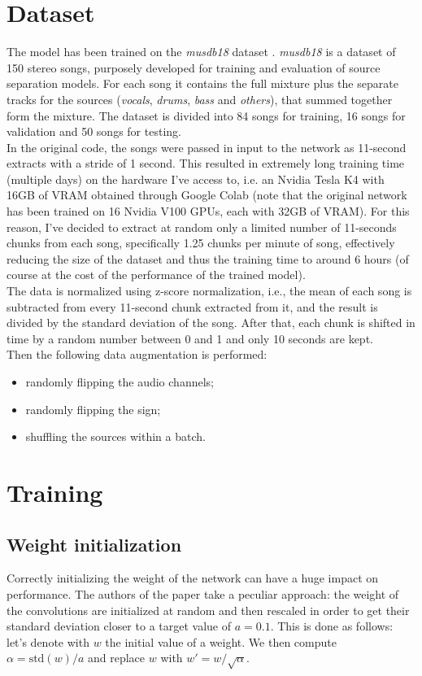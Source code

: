 \documentclass[12pt]{article}
\begin{document}
\newpage
\section{Dataset}\label{sec:data}
The model has been trained on the \textit{musdb18} dataset \cite{musdb18}. \textit{musdb18} is a dataset of 150 stereo songs, purposely developed for training and evaluation of source separation models. For each song it contains the full mixture plus the separate tracks for the sources (\textit{vocals}, \textit{drums}, \textit{bass} and \textit{others}), that summed together form the mixture. The dataset is divided into 84 songs for training, 16 songs for validation and 50 songs for testing.\\
In the original code, the songs were passed in input to the network as 11-second extracts with a stride of 1 second. This resulted in extremely long training time (multiple days) on the hardware I've access to, i.e. an Nvidia Tesla K4 with 16GB of VRAM obtained through Google Colab (note that the original network has been trained on 16 Nvidia V100 GPUs, each with 32GB of VRAM). For this reason, I've decided to extract at random only a limited number of 11-seconds chunks from each song, specifically 1.25 chunks per minute of song, effectively reducing the size of the dataset and thus the training time to around 6 hours (of course at the cost of the performance of the trained model).\\
The data is normalized using z-score normalization, i.e., the mean of each song is subtracted from every 11-second chunk extracted from it, and the result is divided by the standard deviation of the song. After that, each chunk is shifted in time by a random number between 0 and 1 and only 10 seconds are kept.\\
Then the following data augmentation is performed:
\begin{itemize}
\item randomly flipping the audio channels;
\item randomly flipping the sign;
\item shuffling the sources within a batch.
\end{itemize}

 

\newpage
\section{Training}\label{sec:train}
\subsection{Weight initialization}
Correctly initializing the weight of the network can have a huge impact on performance. The authors of the paper take a peculiar approach: the weight of the convolutions are initialized at random and then rescaled in order to get their standard deviation closer to a target value of \(a=0.1\). This is done as follows: let's denote with \(w\) the initial value of a weight. We then compute \(\alpha=\mathrm{std}(w)/a\) and replace \(w\) with \(w'=w/\sqrt\alpha\).
\end{document}
